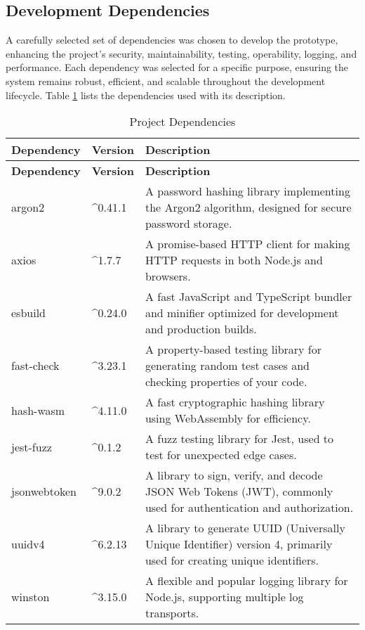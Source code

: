 \subsection{Development Dependencies}
A carefully selected set of dependencies was chosen to develop the prototype, enhancing the project's security, maintainability, testing, operability, logging, and performance. Each dependency was selected for a specific purpose, ensuring the system remains robust, efficient, and scalable throughout the development lifecycle. Table \ref{table:dev_dependencies} lists the dependencies used with its description. 

\begin{longtable}{|l|l|p{8cm}|}
    \caption{Project Dependencies}
    \label{table:dev_dependencies}
\hline
\rowcolor{grey!15}
\textbf{Dependency} & \textbf{Version} & \textbf{Description} \\ \hline
\endfirsthead
\hline
\rowcolor{grey!15}
\textbf{Dependency} & \textbf{Version} & \textbf{Description} \\ \hline
\endhead
\endfoot
\hline
\endlastfoot
argon2 & \textasciicircum 0.41.1 & A password hashing library implementing the Argon2 algorithm, designed for secure password storage. \\ \hline
axios & \textasciicircum 1.7.7 & A promise-based HTTP client for making HTTP requests in both Node.js and browsers. \\ \hline
esbuild & \textasciicircum 0.24.0 & A fast JavaScript and TypeScript bundler and minifier optimized for development and production builds. \\ \hline
fast-check & \textasciicircum 3.23.1 & A property-based testing library for generating random test cases and checking properties of your code. \\ \hline
hash-wasm & \textasciicircum 4.11.0 & A fast cryptographic hashing library using WebAssembly for efficiency. \\ \hline
jest-fuzz & \textasciicircum 0.1.2 & A fuzz testing library for Jest, used to test for unexpected edge cases. \\ \hline
jsonwebtoken & \textasciicircum 9.0.2 & A library to sign, verify, and decode JSON Web Tokens (JWT), commonly used for authentication and authorization. \\ \hline
uuidv4 & \textasciicircum 6.2.13 & A library to generate UUID (Universally Unique Identifier) version 4, primarily used for creating unique identifiers. \\ \hline
winston & \textasciicircum 3.15.0 & A flexible and popular logging library for Node.js, supporting multiple log transports. \\ \hline

\end{longtable}
